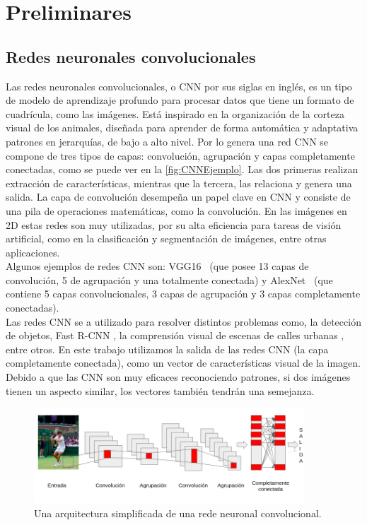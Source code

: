 \chapter{Preliminares}\label{cap:preliminares}


\section{Redes neuronales convolucionales} \label{sec:redesneuronalesconvolucionales}
Las redes neuronales convolucionales, o CNN por sus siglas en inglés, es un tipo de modelo de aprendizaje profundo para procesar datos que tiene un formato de cuadrícula, como las imágenes. Está inspirado en la organización de la corteza visual de los animales, diseñada para aprender de forma automática y adaptativa patrones en jerarquías, de bajo a alto nivel. Por lo genera una red CNN se compone de tres tipos de capas: convolución, agrupación y capas completamente conectadas, como se puede ver en la \autoref{fig:CNNEjemplo}. Las dos primeras realizan extracción de características, mientras que la tercera, las relaciona  y genera una salida. La capa de convolución desempeña un papel clave en CNN y consiste de una pila de operaciones matemáticas, como la convolución. En las imágenes en 2D estas redes son muy utilizadas, por su alta eficiencia para tareas de visión artificial, como en la clasificación y segmentación de imágenes, entre otras aplicaciones.\\

Algunos ejemplos de redes CNN son: VGG16~\cite{simonyan2014very} (que posee 13 capas de convolución, 5 de agrupación y una totalmente conectada) y AlexNet~\cite{krizhevsky2012imagenet} (que contiene 5 capas convolucionales, 3 capas de agrupación y 3 capas completamente conectadas).\\

Las redes CNN se a utilizado para resolver distintos problemas como, la detección de objetos, Fast R-CNN \cite{girshick2015fast}, la comprensión visual de escenas de calles urbanas \cite{cordts2016cityscapes}, entre otros. En este trabajo utilizamos la salida de las redes CNN (la capa completamente conectada), como un vector de características visual de la imagen. Debido a que las CNN son muy eficaces reconociendo patrones, si dos imágenes tienen un aspecto similar, los vectores también tendrán una semejanza.

\begin{figure}
	\centering
	\includegraphics[width=0.9\textwidth]{img/red_cnn.png}
	\caption{Una arquitectura simplificada de una rede neuronal convolucional.}
	\label{fig:CNNEjemplo}
\end{figure}

